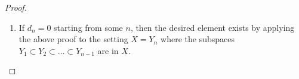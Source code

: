 \documentclass[10pt,a4paper]{amsart}
\begin{document}
\begin{proof}
\begin{enumerate}
\begin{itemize}
$$
d_{2}=\rho(x,Y_{2})=\rho((x-\lambda z)+\lambda z,Y_2)=\rho(\lambda z,Y_{2})=\lambda d_{2};
$$
therefore, $\lambda=1$ and
$$\rho(x,Y_n)=\rho(z,Y_n)=d_n~\mbox{ for all $n\ge 2$}.
$$
This together with the fact that $\rho(x,Y_1)=d_1$ entails $\rho(x,Y_n)=d_n$ for all $n\ge1$.
\item If $d_1=d_2$, then it suffices to take
$$
q_{1,n}=z_1
$$
with $z_1\in Y_2\backslash Y_1$ satisfying $\|z_1\|=1$. The constructions of
$$q_{2,n},~q_{3,n},\ldots$$ are similar to the above proof.
\end{itemize}
\item If $d_n=0$ starting from some $n$, then the desired element exists by applying the above proof to the setting $X=Y_n$  where the subspaces $Y_1\subset Y_2\subset\ldots\subset Y_{n-1}$  are in $X$.
\end{enumerate}
\end{proof}
\end{document}
